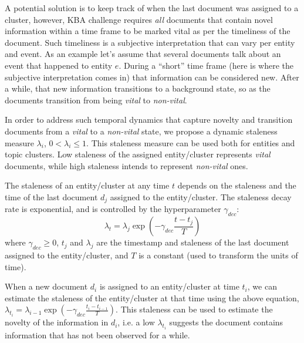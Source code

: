 \documentclass{article}
\begin{document}
A potential solution is to keep track of when the last document was assigned to a cluster, however, KBA challenge requires \emph{all} documents that contain novel information within a time frame to be marked vital as per the timeliness of the document.
Such timeliness is a subjective interpretation that can vary per entity and event. 
As an example let's assume that several documents talk about an event that happened to entity $e$. 
During a ``short'' time frame (here is where the subjective interpretation comes in) that information can be considered new. 
After a while, that new information transitions to a background state, so as the documents transition from being \emph{vital} to \emph{non-vital}.


In order to address such temporal dynamics that capture novelty and transition documents from a \emph{vital} to a \emph{non-vital} state, we propose a dynamic staleness measure $\lambda_i$, $0 < \lambda_i \leq 1$. 
This staleness measure can be used both for entities and topic clusters.
Low staleness of the assigned entity/cluster represents \emph{vital} documents, while high staleness intends to represent \emph{non-vital} ones.

The staleness of an entity/cluster at any time $t$ depends on the staleness and the time of the last document $d_j$ assigned to the entity/cluster. %
The staleness decay rate is exponential, and is controlled by the hyperparameter $\gamma_{dec}$:
\begin{equation}
\label{decrease}
\lambda_t = \lambda_{j} \exp{(-\gamma_{dec} \frac{t-t_j}{T})}
\end{equation}
where $\gamma_{dec} \geq 0$, $t_j$ and $\lambda_j$ are the timestamp and staleness of the last document assigned to the entity/cluster, and $T$ is a constant (used to transform the units of time). %

When a new document $d_i$ is assigned to an entity/cluster at time $t_i$, we can estimate the staleness of the entity/cluster at that time using the above equation, $\lambda_{t_i} = \lambda_{i-1} \exp{(-\gamma_{dec} \frac{t_i-t_{i-1}}{T})}$.
This staleness can be used to estimate the novelty of the information in $d_i$, i.e. a low $\lambda_{t_i}$ suggests the document contains information that has not been observed for a while.
\end{document}
